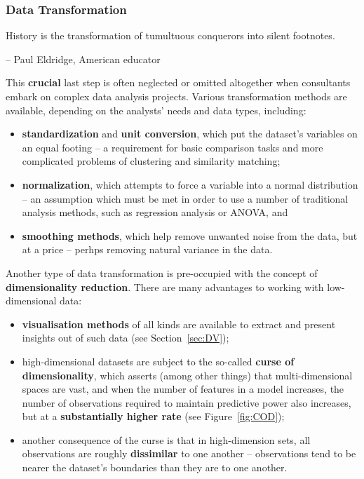 \subsubsection{Data Transformation}
\begin{tcolorbox}[title=It's Also True of Data]
History is the transformation of tumultuous conquerors into silent footnotes. \\[-0.6cm]
\begin{flushright}
-- Paul Eldridge, American educator
\end{flushright}
\end{tcolorbox}
\noindent
This \textbf{crucial} last step is often neglected or omitted altogether when consultants embark on complex data analysis projects. Various transformation methods are available, depending on the analysts' needs and data types, including: \begin{itemize}[noitemsep]
\item \textbf{standardization} and \textbf{unit conversion}, which put the dataset's variables on an equal footing -- a requirement for basic comparison tasks and more complicated problems of clustering and similarity matching;
\item \textbf{normalization}, which  attempts to force a variable into a normal distribution -- an assumption which must be met in order to use a number of traditional analysis methods, such as regression analysis or ANOVA, and 
\item \textbf{smoothing methods}, which help remove unwanted noise from the data, but at a price -- perhps removing natural variance in the data. 
\end{itemize}
Another type of data transformation is pre-occupied with the concept of \textbf{dimensionality reduction}. There are many advantages to working with low-dimensional data:
\begin{itemize}[noitemsep]
\item \textbf{visualisation methods} of all kinds are available to extract and present insights out of such data (see Section~\ref{sec:DV});
\item high-dimensional datasets are subject to the so-called \textbf{curse of dimensionality}, which asserts (among other things) that multi-dimensional spaces are vast, and when the number of features
in a model increases, the number of observations required to maintain predictive
power also increases, but at a \textbf{substantially higher rate} (see Figure~\ref{fig:COD});
\item another consequence of the curse is that in high-dimension sets, all observations are roughly \textbf{dissimilar} to one another -- observations tend to be nearer the dataset's boundaries than they are to one another.  
\end{itemize}
